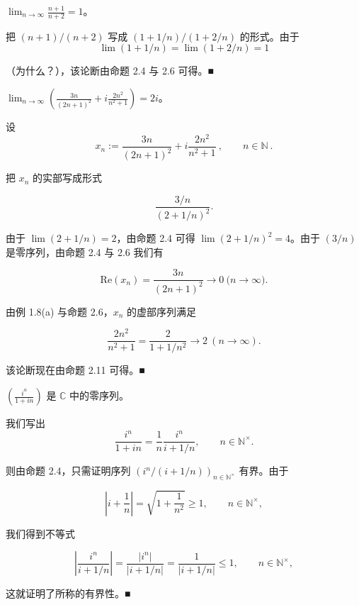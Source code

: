 \begin{example}

\begin{items}
\item

$ \lim_{n \to \infty} \frac{n+1}{n+2} = 1 $。

\proofhead
把 $ (n+1)/(n+2) $ 写成 $ (1+1/n)/(1+2/n) $ 的形式。由于
\[
\lim(1+1/n)=\lim(1+2/n)=1
\]

（为什么？），该论断由命题 2.4 与 2.6 可得。■

\item

$ \lim_{n \to \infty} \left( \frac{3n}{(2n+1)^2} + i \frac{2n^2}{n^2 + 1} \right) = 2i $。

\proofhead
设
\[
x_{n}:=\frac{3n}{(2n+1)^{2}}+i\frac{2n^{2}}{n^{2}+1}~,\qquad n\in\mathbb{N}~.
\]

把 $ x_{n} $ 的实部写成形式

\[
\frac{3/n}{(2+1/n)^{2}}.
\]

由于 $ \lim(2+1/n)=2 $，由命题 2.4 可得 $ \lim(2+1/n)^2=4 $。由于 $ (3/n) $ 是零序列，由命题 2.4 与 2.6 我们有

\[
\mathrm{R e}(x_{n})=\frac{3n}{(2n+1)^{2}}\to0\ \mathrm{(}n\to\infty\mathrm{)}.
\]

由例 1.8(a) 与命题 2.6，$ x_{n} $ 的虚部序列满足

\[
\frac{2n^{2}}{n^{2}+1}=\frac{2}{1+1/n^{2}}\to2\ \left(n\to\infty\right).
\]

该论断现在由命题 2.11 可得。■

\item

$ \left(\frac{i^{n}}{1+in}\right) $ 是 $ \mathbb{C} $ 中的零序列。

\proofhead
我们写出
\[
\frac{i^{n}}{1+i n}=\frac{1}{n}\frac{i^{n}}{i+1/n},\qquad n\in\mathbb{N}^{\times}.
\]

则由命题 2.4，只需证明序列 $ (i^n/(i+1/n))_{n\in\mathbb{N}^\times} $ 有界。由于

\[
\left|i+\frac{1}{n}\right|=\sqrt{1+\frac{1}{n^{2}}}\geq1,\qquad n\in\mathbb{N}^{\times},
\]

我们得到不等式

\[
\left|\frac{i^{n}}{i+1/n}\right|=\frac{|i^{n}|}{|i+1/n|}=\frac{1}{|i+1/n|}\leq1,\qquad n\in\mathbb{N}^{\times},
\]

这就证明了所称的有界性。■

\end{items}

\end{example}

